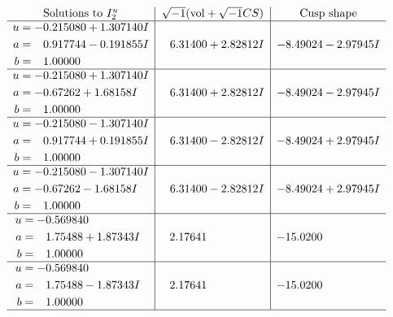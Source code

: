 \documentclass[1p]{elsarticle_modified}
\theoremstyle{definition}
\newcommand{\I}{\sqrt{-1}}
\begin{document}
$$\begin{array}{c|c|c}  
\text{Solutions to }I^u_{2}& \I (\text{vol} + \sqrt{-1}CS) & \text{Cusp shape}\\
 \hline 
\begin{aligned}
u &= -0.215080 + 1.307140 I \\
a &= \phantom{-}0.917744 - 0.191855 I \\
b &= \phantom{-}1.00000\phantom{ +0.000000I}\end{aligned}
 & \phantom{-}6.31400 + 2.82812 I & -8.49024 - 2.97945 I \\ \hline\begin{aligned}
u &= -0.215080 + 1.307140 I \\
a &= -0.67262 + 1.68158 I \\
b &= \phantom{-}1.00000\phantom{ +0.000000I}\end{aligned}
 & \phantom{-}6.31400 + 2.82812 I & -8.49024 - 2.97945 I \\ \hline\begin{aligned}
u &= -0.215080 - 1.307140 I \\
a &= \phantom{-}0.917744 + 0.191855 I \\
b &= \phantom{-}1.00000\phantom{ +0.000000I}\end{aligned}
 & \phantom{-}6.31400 - 2.82812 I & -8.49024 + 2.97945 I \\ \hline\begin{aligned}
u &= -0.215080 - 1.307140 I \\
a &= -0.67262 - 1.68158 I \\
b &= \phantom{-}1.00000\phantom{ +0.000000I}\end{aligned}
 & \phantom{-}6.31400 - 2.82812 I & -8.49024 + 2.97945 I \\ \hline\begin{aligned}
u &= -0.569840\phantom{ +0.000000I} \\
a &= \phantom{-}1.75488 + 1.87343 I \\
b &= \phantom{-}1.00000\phantom{ +0.000000I}\end{aligned}
 & \phantom{-}2.17641\phantom{ +0.000000I} & -15.0200\phantom{ +0.000000I} \\ \hline\begin{aligned}
u &= -0.569840\phantom{ +0.000000I} \\
a &= \phantom{-}1.75488 - 1.87343 I \\
b &= \phantom{-}1.00000\phantom{ +0.000000I}\end{aligned}
 & \phantom{-}2.17641\phantom{ +0.000000I} & -15.0200\phantom{ +0.000000I}\\
 \hline 
 \end{array}$$\newpage\newpage\renewcommand{\arraystretch}{1}
\end{document}
